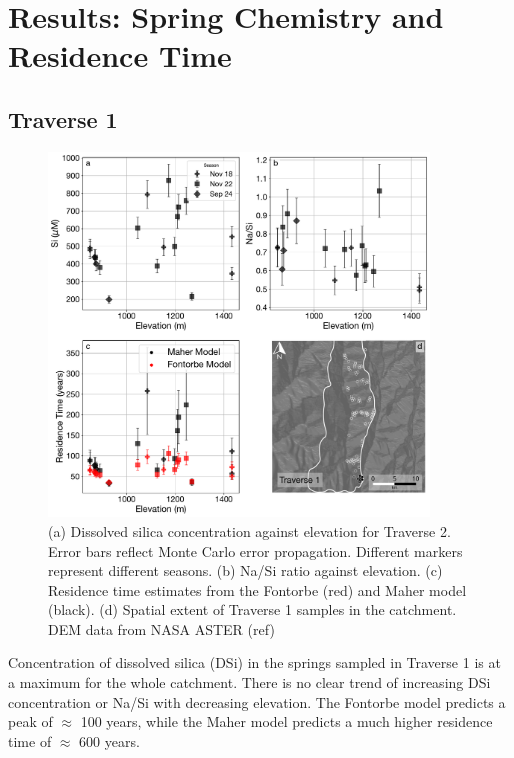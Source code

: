 
\section{Results: Spring Chemistry and Residence Time}

\subsection{Traverse 1}

\begin{figure}[h]
    \centering
        \includegraphics[width=0.9\textwidth]{Traverse_1_summary.pdf}
    \caption{(a) Dissolved silica concentration against elevation for Traverse 2. Error bars reflect Monte Carlo error propagation. Different markers represent different seasons. (b) Na/Si ratio against elevation. (c) Residence time estimates from the Fontorbe (red) and Maher model (black). (d) Spatial extent of Traverse 1 samples in the catchment. DEM data from NASA ASTER (ref)}
    \label{fig:trav1}
\end{figure}

\FloatBarrier

Concentration of dissolved silica (DSi) in the springs sampled in Traverse 1 is at a maximum for the whole catchment. There is no clear trend of increasing DSi concentration or Na/Si with decreasing elevation. The Fontorbe model predicts a peak of $\approx$ 100 years, while the Maher model predicts a much higher residence time of $\approx$ 600 years. 




